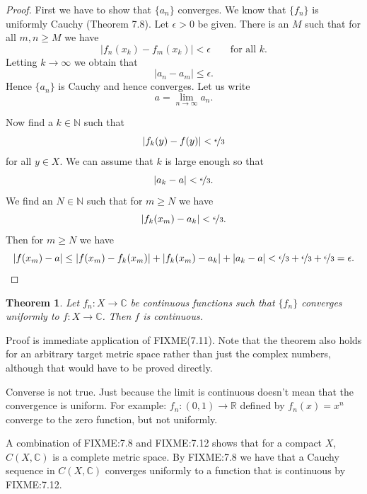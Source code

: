 \documentclass[12pt]{book}
\newcommand{\abs}[1]{\left\lvert {#1} \right\rvert}
\newcommand{\C}{{\mathbb{C}}}
\newcommand{\R}{{\mathbb{R}}}
\newcommand{\N}{{\mathbb{N}}}
\theoremstyle{plain}
\newtheorem{thm}{Theorem}[section]
\theoremstyle{remark}
\theoremstyle{definition}
\theoremstyle{exercise}
\theoremstyle{example}
\begin{document}
\begin{proof}
First we have to show that $\{ a_n \}$ converges.  We know that
$\{ f_n \}$ is uniformly Cauchy (Theorem 7.8). 
Let $\epsilon > 0$ be given.  There is
an $M$ such that for all $m,n \geq M$ we have
\begin{equation*}
\abs{f_n(x_k)-f_m(x_k)} < \epsilon \qquad \text{for all $k$} .
\end{equation*}
Letting $k \to \infty$ we obtain that
$$
\abs{a_n-a_m} \leq \epsilon .
$$
Hence $\{a_n\}$ is Cauchy and hence converges.  Let us
write
$$
a = \lim_{n\to\infty} a_n .
$$

Now find a $k \in \N$ such that
\begin{equation*}
\abs{f_k(y)-f(y)} < \nicefrac{\epsilon}{3}
\end{equation*}
for all $y \in X$.  We can assume that $k$ is large enough
so that
\begin{equation*}
\abs{a_k-a} < \nicefrac{\epsilon}{3}  .
\end{equation*}
We find an $N \in \N$ such that for $m \geq N$
we have 
\begin{equation*}
\abs{f_k(x_m)-a_k} < \nicefrac{\epsilon}{3}  .
\end{equation*}
Then for
$m \geq N$ we have
\begin{equation*}
\abs{f(x_m)-a}
\leq
\abs{f(x_m)-f_k(x_m)}+ \abs{f_k(x_m)-a_k}+ \abs{a_k-a}
<
\nicefrac{\epsilon}{3} +
\nicefrac{\epsilon}{3} +
\nicefrac{\epsilon}{3} = \epsilon . \qedhere
\end{equation*}
\end{proof}

\begin{thm}
Let $f_n \colon X \to \C$ be continuous functions
such that
$\{ f_n \}$ converges uniformly to $f \colon X \to \C$.  
Then $f$ is continuous.
\end{thm}

Proof is immediate application of FIXME(7.11).  Note that the theorem also holds
for an arbitrary target metric space rather than just the complex numbers,
although that would have to be
proved directly.

Converse is not true.  Just because the limit is continuous doesn't mean
that the convergence is uniform.  For example:
$f_n \colon (0,1) \to \R$ defined by $f_n(x) = x^n$ converge to
the zero function, but not uniformly.

A combination of FIXME:7.8 and FIXME:7.12 shows that for a compact $X$, $C(X,\C)$ is a
complete metric space.  By FIXME:7.8 we have that a Cauchy sequence in $C(X,\C)$
converges uniformly to a function that is continuous by FIXME:7.12.
\end{document}
